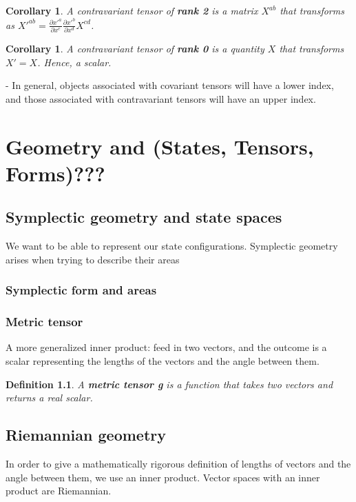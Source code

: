 \documentclass{book}
\newtheorem{defn}[equation]{Definition}
\newtheorem{coro}[equation]{Corollary}
\begin{document}
\begin{coro}
	A contravariant tensor of \textbf{rank 2} is a matrix $X^{ab}$ that transforms as $X'^{ab} = \frac{\partial x'^a}{\partial x^c} \frac{\partial x'^b}{\partial x^d} X^{cd}$. 
\end{coro}

\begin{coro}
	A contravariant tensor of \textbf{rank 0} is a quantity $X$ that transforms $X' = X$. Hence, a scalar. 
\end{coro}

- In general, objects associated with covariant tensors will have a lower index, and those associated with contravariant tensors will have an upper index. 












\chapter{Geometry and (States, Tensors, Forms)???}


\section{Symplectic geometry and state spaces}
We want to be able to represent our state configurations. Symplectic geometry arises when trying to describe their areas

\subsection{Symplectic form and areas}



\subsection{Metric tensor}
A more generalized inner product: feed in two vectors, and the outcome is a scalar representing the lengths of the vectors and the angle between them. 

\begin{defn}
	A \textbf{metric tensor g} is a function that takes two vectors and returns a real scalar. 
\end{defn}


\section{Riemannian geometry}
In order to give a mathematically rigorous definition of lengths of vectors and the angle between them, we use an inner product. Vector spaces with an inner product are Riemannian.
\end{document}
